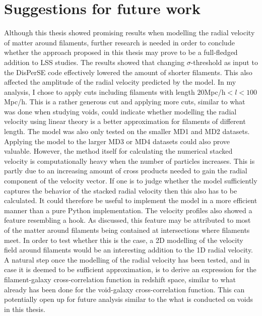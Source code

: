 \section{Suggestions for future work}\label{sec:futurework}
Although this thesis showed promising results when modelling the radial velocity of matter around filaments, further research is needed in order to conclude whether the approach proposed in this thesis may prove to be a full-fledged addition to LSS studies. The results showed that changing $\sigma$-threshold as input to the DisPerSE code effectively lowered the amount of shorter filaments. This also affected the amplitude of the radial velocity predicted by the model. In my analysis, I chose to apply cuts including filaments with length $20$Mpc/h$<l<100$Mpc/h. This is a rather generous cut and applying more cuts, similar to what was done when studying voids, could indicate whether modelling the radial velocity using linear theory is a better approximation for filaments of different length. The model was also only tested on the smaller MD1 and MD2 datasets. Applying the model to the larger MD3 or MD4 datasets could also prove valuable. However, the method itself for calculating the numerical stacked velocity is computationally heavy when the number of particles increases. This is partly due to an increasing amount of cross products needed to gain the radial component of the velocity vector. If one is to judge whether the model sufficiently captures the behavior of the stacked radial velocity then this also has to be calculated. It could therefore be useful to implement the model in a more efficient manner than a pure Python implementation. The velocity profiles also showed a feature resembling a hook. As discussed, this feature may be attributed to most of the matter around filaments being contained at intersections where filaments meet. In order to test whether this is the case, a 2D modelling of the velocity field around filaments would be an interesting addition to the 1D radial velocity. A natural step once the modelling of the radial velocity has been tested, and in case it is deemed to be sufficient approximation, is to derive an expression for the filament-galaxy cross-correlation function in redshift space, similar to what already has been done for the void-galaxy cross-correlation function. This can potentially open up for future analysis similar to the what is conducted on voids in this thesis. \\\indent

